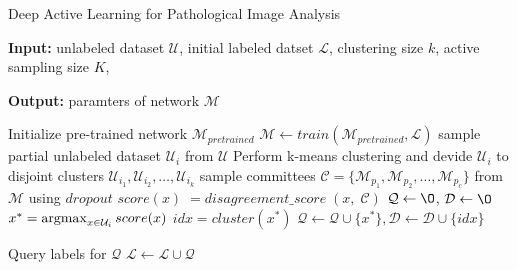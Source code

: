\begin{algorithm}[h]
    \caption{Deep Active Learning for Pathological Image Analysis}
    \label{algo:dal}
    \begin{algorithmic}
        \STATE \textbf{Input: } 
        unlabeled dataset $\mathcal{U}$,
        initial labeled datset $\mathcal{L}$,
        clustering size $k$, 
        active sampling size $K$,
    \end{algorithmic}

    \begin{algorithmic}
        \STATE \textbf{Output: } paramters of network $\mathcal{M}$
    \end{algorithmic}
    
    \begin{algorithmic}[1]
        \STATE Initialize pre-trained network $\mathcal{M}_{pretrained}$
        \REPEAT
            \STATE $\mathcal{M} \leftarrow train (\mathcal{M}_{pretrained}, \mathcal{L})$
            \STATE sample partial unlabeled dataset $\mathcal{U}_i$ from $\mathcal{U}$
            \STATE Perform k-means clustering and devide $\mathcal{U}_i$ to disjoint clusters $\mathcal{U}_{i_1}, \mathcal{U}_{i_2}, \dots, \mathcal{U}_{i_k}$
            \STATE sample committees $\mathcal{C} = \{\mathcal{M}_{p_1}, \mathcal{M}_{p_2}, \dots, \mathcal{M}_{p_c} \}$ from $\mathcal{M}$ using $dropout$ 
                \STATE $score (x) \; = disagreement\_score \; (x, \; \mathcal{C}) $
            \ENDFOR
            \STATE $\mathcal{Q} \leftarrow \O$, $\mathcal{D} \leftarrow \O$
            \STATE $x^{\ast} = \argmax_{x \in \mathcal{U}_i} score(x)$
            \STATE $idx = cluster(x^{\ast})$
            \STATE $\mathcal{Q} \leftarrow \mathcal{Q} \cup \{x^{\ast}\}, \mathcal{D} \leftarrow \mathcal{D} \cup \{idx\}$

            \ENDIF

            \ENDWHILE
            \STATE Query labels for $\mathcal{Q}$
            \STATE $\mathcal{L} \leftarrow \mathcal{L} \cup \mathcal{Q}$

    \end{algorithmic}
  \end{algorithm}
  
